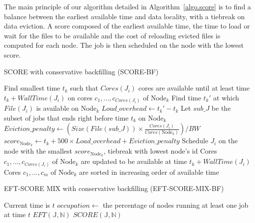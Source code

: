 \documentclass[conference,10pt]{IEEEtran}
\newcommand{\Node}[1]{\ensuremath{\mathrm{Node}_{#1}}\xspace}
\newcommand{\file}{\ensuremath{\mathit{File}}\xspace}
\newcommand{\size}{\ensuremath{\mathit{Size}}\xspace}
\newcommand{\bandwidth}{\mathit{BW}\xspace}
\newcommand{\core}{\mathit{Cores}\xspace}
\newcommand{\walltime}{\mathit{WallTime}\xspace}
\newcommand{\jobset}{\ensuremath{\mathbb{J}}\xspace}
\newcommand{\nodeset}{\ensuremath{\mathbb{N}}\xspace}
\begin{document}
The main principle of our algorithm detailed in Algorithm~\ref{algo.score} 
is to find a balance between the earliest available time and data locality,
with a tiebreak on data eviction. A score composed of the earliest available 
time, the time to load or wait for the files to be available and the cost of 
reloading evicted files is computed for each node. The job is then scheduled
on the node with the lowest score.


\begin{algorithm}[htbp]
\caption{SCORE with conservative backfilling (SCORE-BF)}\label{algo.score}
\begin{algorithmic}[1]
		\ForEach{$\Node{k} \in \nodeset$}
			\State Find smallest time $t_k$ such that $\core(J_i)$ cores are available until at least time $t_k + \walltime(J_i)$ on cores $c_1, ..., c_{\core(J_i)}$ of $\Node{k}$
			\State Find time $t_k'$ at which $\file(J_i)$ is available on $\Node{k}$
			\State $Load\_overhead \gets t_k' - t_k$ 
			\State Let $\mathit{sub\_J}$ be the subset of jobs that ends right before time $t_k$ on $\Node{k}$
			\State $Eviction\_penalty \gets (\size(\file(\mathit{sub\_J})) \times \frac{\core(J_i)}{\core(\Node{k})})/\bandwidth$
			\State $score_{\Node{k}} \gets t_k + 500 \times Load\_overhead + Eviction\_penalty$
		\EndFor
		\State Schedule $J_i$ on the node with the smallest $score_{\Node{k}}$, tiebreak with lowest node's id
		\State Cores $c_1, ..., c_{\core(J_i)}$ of $\Node{k}$ are updated to be available at time $t_k + \walltime(J_i)$
		\State Cores $c_1, ..., c_m$ of $\Node{k}$ are sorted in increasing order of available time
	\EndFor
\end{algorithmic}
\end{algorithm}

\begin{algorithm}[htbp]
\caption{EFT-SCORE MIX with conservative backfilling (EFT-SCORE-MIX-BF)}
\begin{algorithmic}[1]
	\Statex Current time is $t$
		\State $occupation \gets$ the percentage of nodes running at least one job at time $t$
			\State $EFT(\jobset,\nodeset)$
		\Else
			\State $SCORE(\jobset,\nodeset)$
		\EndIf
	\EndFor
\end{algorithmic}
\end{algorithm}
\end{document}
